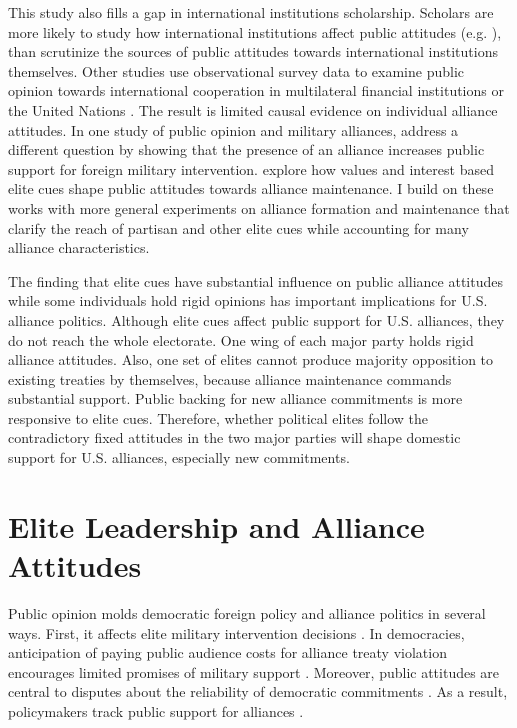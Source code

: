 \documentclass[12pt]{article}
\begin{document}
This study also fills a gap in international institutions scholarship. 
Scholars are more likely to study how international institutions affect public attitudes (e.g. \citep{KayaWalker2014, Greenhill2020}), than scrutinize the sources of public attitudes towards international institutions themselves. 
Other studies use observational survey data to examine public opinion towards international cooperation in multilateral financial institutions \citep{Edwards2009} or the United Nations \citep{Torgler2008, DellmuthTallberg2015}. 
The result is limited causal evidence on individual alliance attitudes.
In one study of public opinion and military alliances, \citet{TomzWeeks2021} address a different question by showing that the presence of an alliance increases public support for foreign military intervention. 
\citet{Chuetal2021} explore how values and interest based elite cues shape public attitudes towards alliance maintenance. 
I build on these works with more general experiments on alliance formation and maintenance that clarify the reach of partisan and other elite cues while accounting for many alliance characteristics. 


The finding that elite cues have substantial influence on public alliance attitudes while some individuals hold rigid opinions has important implications for U.S. alliance politics. 
Although elite cues affect public support for U.S. alliances, they do not reach the whole electorate.
One wing of each major party holds rigid alliance attitudes.
Also, one set of elites cannot produce majority opposition to existing treaties by themselves, because alliance maintenance commands substantial support. 
Public backing for new alliance commitments is more responsive to elite cues. 
Therefore, whether political elites follow the contradictory fixed attitudes in the two major parties will shape domestic support for U.S. alliances, especially new commitments.



\section{Elite Leadership and Alliance Attitudes}


Public opinion molds democratic foreign policy and alliance politics in several ways.
First, it affects elite military intervention decisions \citep{Tomzetal2020, LinGreenberg2021}. 
In democracies, anticipation of paying public audience costs for alliance treaty violation encourages limited promises of military support \citep{Chibaetal2015, FjelstulReiter2019}. 
Moreover, public attitudes are central to disputes about the reliability of democratic commitments \citep{Gaubatz1996, GartzkeGleditsch2004}. 
As a result, policymakers track public support for alliances \citep{Sayle2019}. 
\end{document}
